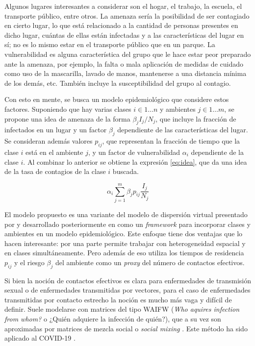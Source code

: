 \begin{intro}
Algunos lugares interesantes a considerar son el hogar, el trabajo, la escuela, el transporte público, entre otros. La amenaza sería la posibilidad de ser contagiado en cierto lugar, lo que está relacionado a la cantidad de personas presentes en dicho lugar, cuántas de ellas están infectadas y a las características del lugar en sí; no es lo mismo estar en el transporte público que en un parque. La vulnerabilidad es alguna característica del grupo que le hace estar peor preparado ante la amenaza, por ejemplo, la falta o mala aplicación de medidas de cuidado como uso de la mascarilla, lavado de manos, mantenerse a una distancia mínima de los demás, etc. También incluye la susceptibilidad del grupo al contagio.

Con esto en mente, se busca un modelo epidemiológico que considere estos factores. Suponiendo que hay varias clases \(i \in 1 \dots n\) y ambientes \(j \in 1 \dots m\), se propone una idea de amenaza de la forma \(\beta_j I_j/N_j\), que incluye la fracción de infectados en un lugar y un factor \(\beta_j\) dependiente de las características del lugar. Se consideran además valores \(p_{ij}\), que representan la fracción de tiempo que la clase \(i\) está en el ambiente \(j\), y un factor de vulnerabilidad \(\alpha_i\) dependiente de la clase \(i\). Al combinar lo anterior se obtiene la expresión \ref{eq:idea}, que da una idea de la tasa de contagios de la clase \(i\) buscada.

\begin{equation}\label{eq:idea}
\alpha_i \sum_{j = 1}^m \beta_j p_{ij} \frac{I_j}{N_j}
\end{equation}


El modelo propuesto es una variante del modelo de dispersión virtual presentado por \cite{Bichara2015} y desarrollado posteriormente en \cite{Bichara2018} como un \textit{framework} para incorporar clases y ambientes en un modelo epidemiológico. Este enfoque tiene dos ventajas que lo hacen interesante: por una parte permite trabajar con heterogeneidad espacial y en clases simultáneamente. Pero además de eso utiliza los tiempos de residencia \(p_{ij}\) y el riesgo \(\beta_j\) del ambiente como un \textit{proxy} del número de contactos efectivos.

Si bien la noción de contactos efectivos es clara para enfermedades de transmisión sexual o de enfermedades transmitidas por vectores, para el caso de enfermedades transmitidas por contacto estrecho la noción es mucho más vaga y difícil de definir. Suele modelarse con matrices del tipo WAIFW (\textit{Who aquires infection from whom?} o ¿Quién adquiere la infección de quién?), que a su vez son aproximadas por matrices de mezcla social o \textit{social mixing} \cite{Mossong2008}\cite{Prem2017}. Este método ha sido aplicado al COVID-19 \cite{Prem2020}. 


\end{intro}

